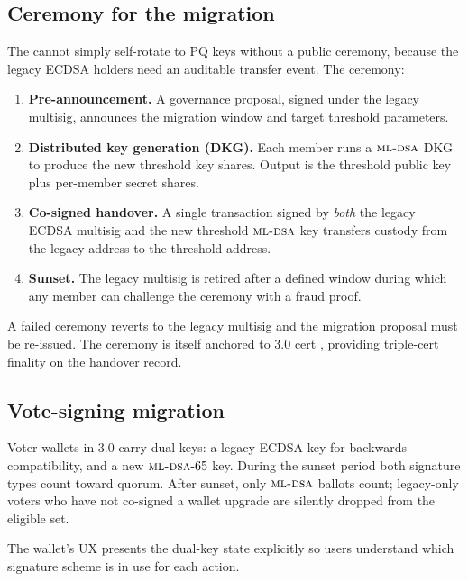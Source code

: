 \subsection{Ceremony for the migration}

The \DAO{} cannot simply self-rotate to PQ keys without a public
ceremony, because the legacy ECDSA holders need an auditable transfer
event. The ceremony:

\begin{enumerate}[leftmargin=1.4em]
  \item \textbf{Pre-announcement.} A governance proposal, signed
        under the legacy multisig, announces the migration window
        and target threshold parameters.
  \item \textbf{Distributed key generation (DKG).} Each member runs
        a $\textsc{ml-dsa}{}$ DKG to produce the new threshold key shares.
        Output is the threshold public key plus per-member secret
        shares.
  \item \textbf{Co-signed handover.} A single transaction signed by
        \emph{both} the legacy ECDSA multisig and the new threshold
        $\textsc{ml-dsa}{}$ key transfers custody from the legacy address
        to the threshold address.
  \item \textbf{Sunset.} The legacy multisig is retired after a
        defined window during which any member can challenge the
        ceremony with a fraud proof.
\end{enumerate}

A failed ceremony reverts to the legacy multisig and the migration
proposal must be re-issued. The ceremony is itself anchored to
\Quasar{} 3.0 cert \cite{lp-020}, providing triple-cert finality on
the handover record.

\subsection{Vote-signing migration}

Voter wallets in 3.0 carry dual keys: a legacy ECDSA key for backwards
compatibility, and a new $\textsc{ml-dsa}{}\text{-}65$ key. During the sunset
period both signature types count toward quorum. After sunset, only
$\textsc{ml-dsa}{}$ ballots count; legacy-only voters who have not co-signed
a wallet upgrade are silently dropped from the eligible set.

The wallet's UX presents the dual-key state explicitly so users
understand which signature scheme is in use for each action.

